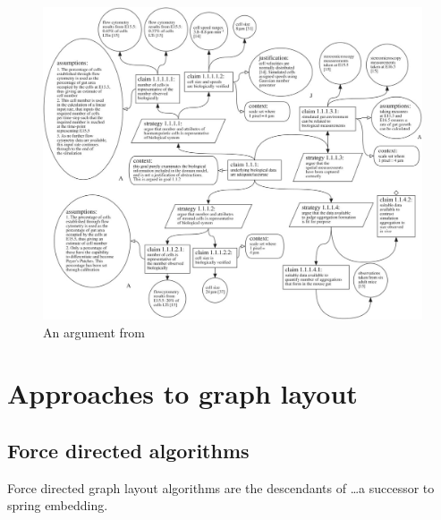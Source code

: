 \begin{figure}
    \includegraphics[width=\textwidth]{graphics/aldencentral.jpg}
    \caption{An argument from }
    \label{fig:aldencentral}
\end{figure}











\section{Approaches to graph layout}

\subsection{Force directed algorithms}

Force directed graph layout algorithms are the descendants of  \citet{tutte} \ldots a successor to \citet{tutte} spring embedding.

